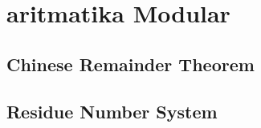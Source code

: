 \section{aritmatika Modular}
  \subsection{Chinese Remainder Theorem}
  \subsection{Residue Number System}
